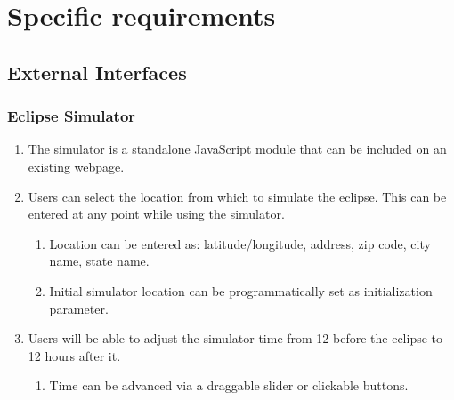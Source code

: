 \documentclass[10pt, onecolumn, draftclsnofoot, letterpaper, compsoc]{IEEEtran}
\begin{document}
\section{Specific requirements}

\subsection{External Interfaces}

\subsubsection{Eclipse Simulator}
	\begin{enumerate}
		\item The simulator is a standalone JavaScript module that can
		be included on an existing webpage.

		\item Users can select the location from which to simulate the eclipse.
		This can be entered at any point while using the simulator.
		\begin{enumerate}
			\item Location can be entered as: latitude/longitude, address, zip code,
			city name, state name.
			\item Initial simulator location can be programmatically set as
			initialization parameter.
		\end{enumerate}

		\item Users will be able to adjust the simulator time from 12 before
		the eclipse to 12 hours after it.
		\begin{enumerate}
			\item Time can be advanced via a draggable slider or clickable buttons.
		\end{enumerate}

	\end{enumerate}
\end{document}
